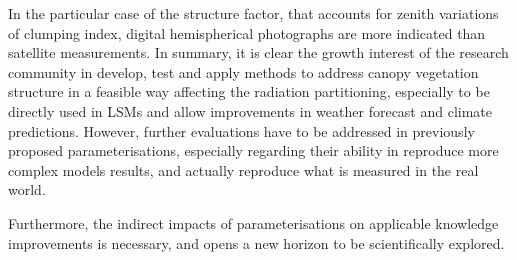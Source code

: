 In the particular case of the structure factor, that accounts for zenith variations of clumping index, digital hemispherical photographs are more indicated than satellite measurements. 
In summary, it is clear the growth interest of the research community in develop, test and apply methods to address canopy vegetation structure in a feasible way affecting the radiation partitioning, especially to be directly used in LSMs and allow improvements in weather forecast and climate predictions.
However, further evaluations have to be addressed in previously proposed parameterisations, especially regarding their ability in reproduce more complex models results, and actually reproduce what is measured in the real world. 

Furthermore, the indirect impacts of parameterisations on applicable knowledge improvements is necessary, and opens a new horizon to be scientifically explored. 




